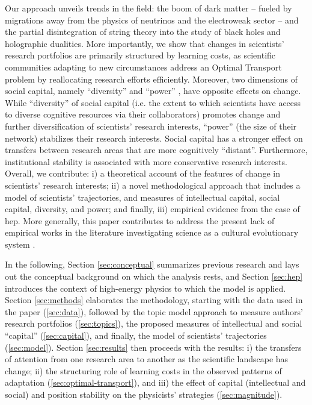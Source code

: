 \documentclass{article}
\begin{document}
Our approach unveils trends in the field: the boom of dark matter -- fueled by migrations away from the physics of neutrinos and the electroweak sector -- and the partial disintegration of string theory into the study of black holes and holographic dualities. More importantly, we show that changes in scientists' research portfolios are primarily structured by learning costs, as scientific communities adapting to new circumstances address an Optimal Transport problem by reallocating research efforts efficiently. Moreover, two dimensions of social capital, namely ``diversity'' and ``power'' \citep{Abbasi2014}, have opposite effects on change. While ``diversity'' of social capital (i.e. the extent to which scientists have access to diverse cognitive resources via their collaborators) promotes change and further diversification of scientists' research interests, ``power'' (the size of their network) stabilizes their research interests. Social capital has a stronger effect on transfers between research areas that are more cognitively ``distant''. Furthermore, institutional stability is associated with more conservative research interests. %
Overall, we contribute: i) a theoretical account of the features of change in scientists' research interests; ii) a novel methodological approach that includes a model of scientists' trajectories, and measures of intellectual capital, social capital, diversity, and power; and finally, iii) empirical evidence from the case of \gls{hep}. More generally, this paper contributes to address the present lack of empirical works in the literature investigating science as a cultural evolutionary system \citep{Wu2023}.

In the following, Section \ref{sec:conceptual} summarizes previous research and lays out the conceptual background on which the analysis rests, and Section \ref{sec:hep} introduces the context of high-energy physics to which the model is applied. %
Section \ref{sec:methods} elaborates the methodology, starting with the data used in the paper (\ref{sec:data}), followed by the topic model approach to measure authors' research portfolios (\ref{sec:topics}), the proposed measures of intellectual and social ``capital'' (\ref{sec:capital}), and finally, the model of scientists' trajectories (\ref{sec:model}).
Section \ref{sec:results} then proceeds with the results: i) the transfers of attention from one research area to another as the scientific landscape has change; ii) the structuring role of learning costs in the observed patterns of adaptation (\ref{sec:optimal-transport}), and iii) the effect of capital (intellectual and social) and position stability on the physicists' strategies (\ref{sec:magnitude}). %
\end{document}
